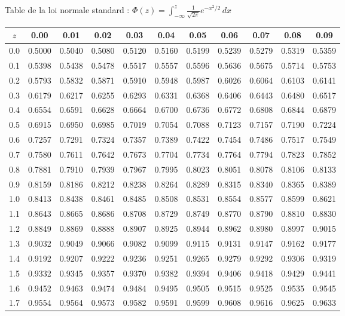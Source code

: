 \documentclass{BeamerTemplate}
\begin{document}
\begin{frame}[t]{Table de la loi normale standard :
    $\Phi(z) = \int_{-\infty}^{z} \frac{1}{\sqrt{2\pi}} e^{-x^2/2}\,dx$}
  \centering\tiny
  \renewcommand{\arraystretch}{0.95}
  \setlength{\tabcolsep}{4pt}
  \begin{tabular}{c|cccccccccc}
    \toprule
    $z$ & 0.00 & 0.01 & 0.02 & 0.03 & 0.04 & 0.05 & 0.06 & 0.07 & 0.08 & 0.09 \\
    \midrule
0.0 & 0.5000 & 0.5040 & 0.5080 & 0.5120 & 0.5160 & 0.5199 & 0.5239 & 0.5279 & 0.5319 & 0.5359 \\
0.1 & 0.5398 & 0.5438 & 0.5478 & 0.5517 & 0.5557 & 0.5596 & 0.5636 & 0.5675 & 0.5714 & 0.5753 \\
0.2 & 0.5793 & 0.5832 & 0.5871 & 0.5910 & 0.5948 & 0.5987 & 0.6026 & 0.6064 & 0.6103 & 0.6141 \\
0.3 & 0.6179 & 0.6217 & 0.6255 & 0.6293 & 0.6331 & 0.6368 & 0.6406 & 0.6443 & 0.6480 & 0.6517 \\
0.4 & 0.6554 & 0.6591 & 0.6628 & 0.6664 & 0.6700 & 0.6736 & 0.6772 & 0.6808 & 0.6844 & 0.6879 \\
\midrule
0.5 & 0.6915 & 0.6950 & 0.6985 & 0.7019 & 0.7054 & 0.7088 & 0.7123 & 0.7157 & 0.7190 & 0.7224 \\
0.6 & 0.7257 & 0.7291 & 0.7324 & 0.7357 & 0.7389 & 0.7422 & 0.7454 & 0.7486 & 0.7517 & 0.7549 \\
0.7 & 0.7580 & 0.7611 & 0.7642 & 0.7673 & 0.7704 & 0.7734 & 0.7764 & 0.7794 & 0.7823 & 0.7852 \\
0.8 & 0.7881 & 0.7910 & 0.7939 & 0.7967 & 0.7995 & 0.8023 & 0.8051 & 0.8078 & 0.8106 & 0.8133 \\
0.9 & 0.8159 & 0.8186 & 0.8212 & 0.8238 & 0.8264 & 0.8289 & 0.8315 & 0.8340 & 0.8365 & 0.8389 \\
\midrule
1.0 & 0.8413 & 0.8438 & 0.8461 & 0.8485 & 0.8508 & 0.8531 & 0.8554 & 0.8577 & 0.8599 & 0.8621 \\
1.1 & 0.8643 & 0.8665 & 0.8686 & 0.8708 & 0.8729 & 0.8749 & 0.8770 & 0.8790 & 0.8810 & 0.8830 \\
1.2 & 0.8849 & 0.8869 & 0.8888 & 0.8907 & 0.8925 & 0.8944 & 0.8962 & 0.8980 & 0.8997 & 0.9015 \\
1.3 & 0.9032 & 0.9049 & 0.9066 & 0.9082 & 0.9099 & 0.9115 & 0.9131 & 0.9147 & 0.9162 & 0.9177 \\
1.4 & 0.9192 & 0.9207 & 0.9222 & 0.9236 & 0.9251 & 0.9265 & 0.9279 & 0.9292 & 0.9306 & 0.9319 \\
\midrule
1.5 & 0.9332 & 0.9345 & 0.9357 & 0.9370 & 0.9382 & 0.9394 & 0.9406 & 0.9418 & 0.9429 & 0.9441 \\
1.6 & 0.9452 & 0.9463 & 0.9474 & 0.9484 & 0.9495 & 0.9505 & 0.9515 & 0.9525 & 0.9535 & 0.9545 \\
1.7 & 0.9554 & 0.9564 & 0.9573 & 0.9582 & 0.9591 & 0.9599 & 0.9608 & 0.9616 & 0.9625 & 0.9633 \\
    \bottomrule
  \end{tabular}
\end{frame}
\end{document}
